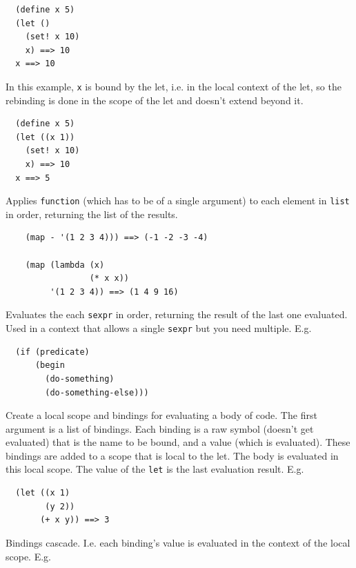 \documentclass[12pt]{article}
\begin{document}
\begin{verbatim}
  (define x 5)
  (let ()
    (set! x 10)
    x) ==> 10
  x ==> 10
\end{verbatim}

In this example, \verb|x| is bound by the let, i.e. in the local
context of the let, so the rebinding is done in the scope of the let
and doesn't extend beyond it.

\begin{verbatim}
  (define x 5)
  (let ((x 1))
    (set! x 10)
    x) ==> 10
  x ==> 5
\end{verbatim}


Applies \verb|function| (which has to be of a single argument) to each
element in \verb|list| in order, returning the list of the results. 

\begin{verbatim}
    (map - '(1 2 3 4))) ==> (-1 -2 -3 -4)

    (map (lambda (x)
                 (* x x))
         '(1 2 3 4)) ==> (1 4 9 16)
\end{verbatim}


Evaluates the each \verb|sexpr| in order, returning the result of the
last one evaluated. Used in a context that allows a single
\verb|sexpr| but you need multiple. E.g.

\begin{verbatim}
  (if (predicate)
      (begin
        (do-something)
        (do-something-else)))
\end{verbatim}


Create a local scope and bindings for evaluating a body of code. The
first argument is a list of bindings. Each binding is a raw symbol
(doesn't get evaluated) that is the name to be bound, and a value
(which is evaluated). These bindings are added to a scope that is
local to the let. The body is evaluated in this local scope. The value
of the \verb|let| is the last evaluation result. E.g.

\begin{verbatim}
  (let ((x 1)
        (y 2))
       (+ x y)) ==> 3
\end{verbatim}

Bindings cascade. I.e. each binding's value is evaluated in the
context of the local scope. E.g.
\end{document}
